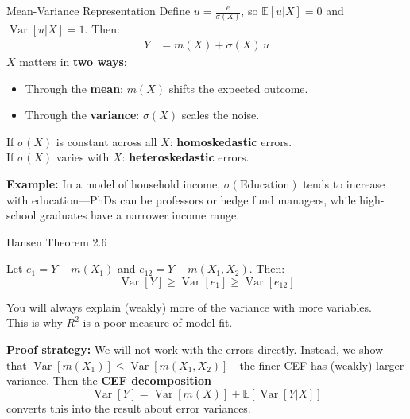 \documentclass[aspectratio=169]{beamer}
\numberwithin{equation}{section}
\begin{document}
\begin{frame}{Mean-Variance Representation}
Define $u=\frac{e}{\sigma(X)}$, so $\mathbb{E}[u|X]=0$ and $\operatorname{Var}[u|X]=1$.  Then:
\begin{align*}
Y&=m(X)+\sigma(X)\, u
\end{align*}
\pause
$X$ matters in \textbf{two ways}:
\begin{itemize}
\item Through the \textbf{mean}: $m(X)$ shifts the expected outcome.
\item Through the \textbf{variance}: $\sigma(X)$ scales the noise.
\end{itemize}

\bigskip\pause
If $\sigma(X)$ is constant across all $X$: \textbf{homoskedastic} errors.\\
If $\sigma(X)$ varies with $X$: \textbf{heteroskedastic} errors.

\bigskip\pause
\textbf{Example:} In a model of household income, $\sigma(\text{Education})$ tends to increase with education---PhDs can be professors or hedge fund managers, while high-school graduates have a narrower income range.
\end{frame}


\begin{frame}{Hansen Theorem 2.6}
\begin{tcolorbox}[colback=blue!5, colframe=blue!50, title=Theorem 2.6 (More Variables Reduce Error Variance)]
Let $e_1=Y-m(X_1)$ and $e_{12}=Y-m(X_1, X_2)$.  Then:
$$\operatorname{Var}[Y]\geq \operatorname{Var}[e_1]\geq \operatorname{Var}[e_{12}]$$
\end{tcolorbox}
\medskip
You will always explain (weakly) more of the variance with more variables.\\
This is why $R^2$ is a poor measure of model fit.

\medskip\pause
\textbf{Proof strategy:} We will not work with the errors directly.  Instead, we show that $\operatorname{Var}[m(X_1)] \leq \operatorname{Var}[m(X_1,X_2)]$---the finer CEF has (weakly) larger variance.  Then the \textbf{CEF decomposition}
$$\operatorname{Var}[Y] = \operatorname{Var}[m(X)] + \mathbb{E}[\operatorname{Var}[Y|X]]$$
converts this into the result about error variances.
\end{frame}
\end{document}
